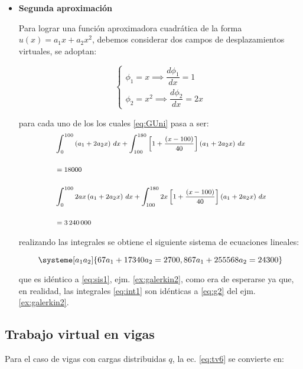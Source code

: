 \begin{example}
\begin{itemize}
			\item \textbf{Segunda aproximación}
			
			Para lograr una función aproximadora cuadrática de la forma $u(x) = a_1x + a_2x^2$, debemos considerar dos campos de desplazamientos virtuales, se adoptan:
			
			\begin{equation}
				\begin{cases}
					\phi_1 = x \implies \dfrac{d \phi_1}{dx} = 1\\[4mm]
					\phi_2 = x^2 \implies \dfrac{d \phi_2}{dx} = 2x
				\end{cases}
			\end{equation}
			
			para cada uno de los los cuales \eqref{eq:GUni} pasa a ser:
			\begin{equation}
				\footnotesize
				\begin{split}
					& \int_{0}^{100} \left(a_1 + 2a_2x \right) \, dx + \int_{100}^{180} \left[1 + \dfrac{ \left( x-100 \right)}{40} \right] \left(a_1 + 2a_2x \right) \, dx \\[4mm]&= 18000 \\[4mm]
					& \int_{0}^{100} 2ax \left(a_1 + 2a_2x \right) \, dx + \int_{100}^{180} 2x \left[1 + \dfrac{ \left( x-100 \right)}{40} \right] \left(a_1 + 2a_2x \right) \, dx \\[4mm]&= \num{3240000}
				\end{split}
				\label{eq:int1}
			\end{equation}
			
			realizando las integrales se obtiene el siguiente sistema de ecuaciones lineales:
			
			\begin{equation}
				\systeme[a_1 a_2]{67a_1 + 17340a_2 = 2700, 867a_1 + 255568a_2 = 24300}
			\end{equation}
			
			que es idéntico a \eqref{eq:sis1}, ejm. \ref{ex:galerkin2}, como era de esperarse ya que, en realidad, las integrales \eqref{eq:int1} son idénticas a \eqref{eq:g2} del ejm. \ref{ex:galerkin2}.
		\end{itemize}
\end{example}

\subsection{Trabajo virtual en vigas}
Para el caso de vigas con cargas distribuidas $q$, la ec. \eqref{eq:tv6} se convierte en:


